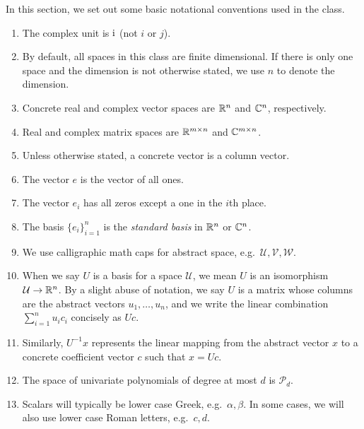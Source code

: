 \documentclass[12pt, leqno]{article} %
\begin{document}
In this section, we set out some basic notational conventions used
in the class.
\begin{enumerate}
\item
  The complex unit is $\mathrm{i}$ (not $i$ or $j$).

\item
  By default, all spaces in this class are finite dimensional. If there
  is only one space and the dimension is not otherwise stated, we use
  $n$ to denote the dimension.

\item
  Concrete real and complex vector spaces are $\mathbb{R}^n$ and $\mathbb{C}^n$,
  respectively.

\item
  Real and complex matrix spaces are $\mathbb{R}^{m\times n}$ and $\mathbb{C}^{m
  \times n}$.

\item Unless otherwise stated, a concrete vector is a column vector.

\item The vector $e$ is the vector of all ones.

\item The vector $e_i$ has all zeros except a one in the $i$th place.

\item
  The basis $\{ e_i \}_{i=1}^n$ is the {\em standard basis} in $\mathbb{R}^n$
  or $\mathbb{C}^n$.

\item
  We use calligraphic math caps for abstract space,
  e.g.~$\mathcal{U}, \mathcal{V}, \mathcal{W}$.

\item
   When we say $U$ is a basis for a space $\mathcal{U}$, we mean $U$ is
   an isomorphism $\mathcal{U} \rightarrow \mathbb{R}^n$.  By a slight abuse
   of notation, we say $U$ is a matrix whose columns are the abstract
   vectors $u_1, \ldots, u_n$, and we write the linear combination
   $\sum_{i=1}^n u_i c_i$ concisely as $Uc$.

\item
  Similarly, $U^{-1} x$ represents the linear mapping from the
  abstract vector $x$ to a concrete coefficient vector $c$ such
  that $x = Uc$.

\item The space of univariate polynomials of degree at most
  $d$ is $\mathcal{P}_d$.

\item
  Scalars will typically be lower case Greek, e.g.~$\alpha, \beta$. In
  some cases, we will also use lower case Roman letters, e.g.~$c, d$.


\end{enumerate}
\end{document}
